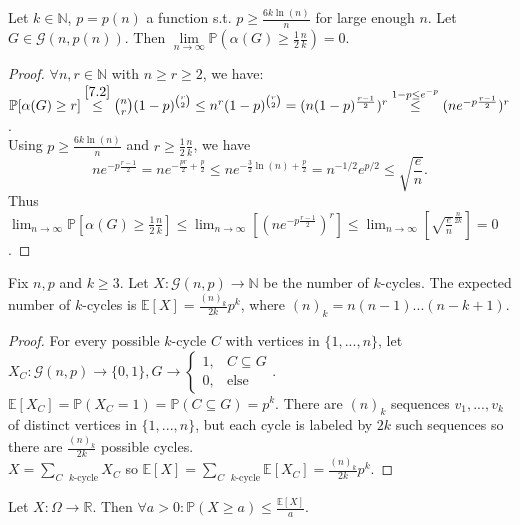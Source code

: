 \begin{lemma}\label{7.3}
    Let $k\in\mathbb{N}$, $p=p(n)$ a function s.t. $p\geq\frac{6k\ln(n)}{n}$ for large enough $n$. Let $
    G\in\mathcal{G}(n,p(n))$. Then $\lim\limits_{n\to\infty}\mathbb{P}(\alpha(G)\geq\frac{1}{2}\frac{n}{k})=0$.
\end{lemma}
\begin{proof}
    $\forall n,r\in\mathbb{N}$ with $n\geq r\geq2$, we have:\\
    $\mathbb{P}[\alpha(G)\geq r]\stackrel{\ref{7.2}}{\leq}\binom{n}{r}(1-p)^{\binom{r}{2}}\leq n^r (1-p)^{\binom{r}{2}}=(n(1-p)^{\frac{r-1}{2}})^r\stackrel{1-p\leq e^{-p}}{\leq}(ne^{-p\frac{r-1}{2}})^r$.\\
    Using $p\geq \frac{6k\ln(n)}{n}$ and $r\geq\frac{1}{2}\frac{n}{k}$, we have
    \[ne^{-p\frac{r-1}{2}}=ne^{-\frac{pr}{2}+\frac{p}{2}}\leq ne^{-\frac{3}{2}\ln(n)+\frac{p}{2}}=n^{-1/2}e^{p/2}\leq\sqrt{\frac{e}{n}}.\]
    Thus $\lim_{n\to\infty}\mathbb{P}[\alpha(G)\geq \frac{1}{2}\frac{n}{k}]\leq\lim_{n\to\infty}[(ne^{-p\frac{r-1}{2}})^r]\leq\lim_{n\to\infty}[\sqrt{\frac{e}{n}}^{\frac{n}{2k}}]=0$.
\end{proof}
\begin{lemma}\label{7.4}
    Fix $n,p$ and $k\geq 3$. Let $X:\mathcal{G}(n,p)\to\mathbb{N}$ be the number of $k$-cycles. The expected number of $k$-cycles is $\mathbb{E}[X]=\frac{(n)_k}{2k}p^k$, where $(n)_k=n(n-1)...(n-k+1)$.
\end{lemma}
\begin{proof}
    For every possible $k$-cycle $C$ with vertices in $\{1,...,n\}$, let $X_C:\mathcal{G}(n,p)\to\{0,1\},G\to\begin{cases}
        1, & C\subseteq G \\
        0, & \text{else}
    \end{cases}$.\\
    $\mathbb{E}[X_C]=\mathbb{P}(X_C=1)=\mathbb{P}(C\subseteq G)=p^k$. There are $(n)_k$ sequences $v_1,...,v_k$ of distinct vertices in $\{1,...,n\}$, but each cycle is labeled by $2k$ such sequences so there are $\frac{(n)_k}{2k}$ possible cycles.\\
    $X=\sum\limits_{C \text{ }k\text{-cycle}} X_C$ so $\mathbb{E}[X]=\sum\limits_{C \text{ }k\text{-cycle}} \mathbb{E}[X_C]=\frac{(n)_k}{2k}p^k$.
\end{proof}
\begin{lemma}\label{7.5}
    Let $X:\Omega\to\mathbb{R}$. Then $\forall a>0:\mathbb{P}(X\geq a)\leq\frac{\mathbb{E}[X]}{a}$.
\end{lemma}
